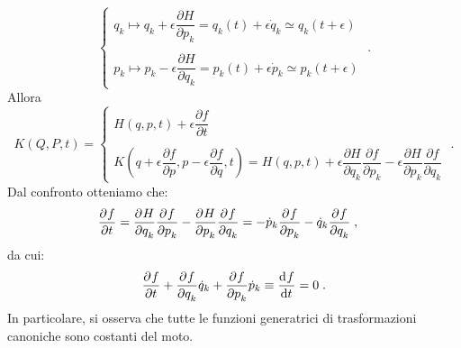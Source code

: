 \begin{equation}
\begin{cases}
q_k\longmapsto q_k+\epsilon\dfrac{\partial H}{\partial p_k}=q_k(t)+\epsilon\dot{q}_k\simeq q_k(t+\epsilon) \\
\\
p_k\longmapsto p_k-\epsilon\dfrac{\partial H}{\partial q_k}=p_k(t)+\epsilon\dot{p}_k\simeq p_k(t+\epsilon)
\end{cases}\;.
\end{equation}
Allora
\begin{equation}
K(Q,P,t) = \begin{cases}
H(q,p,t)+\epsilon\dfrac{\partial f}{\partial t} \\
\\
K\left(q+\epsilon\dfrac{\partial f}{\partial p},p-\epsilon\dfrac{\partial f}{\partial q},t\right)=H(q,p,t)+\epsilon\dfrac{\partial H}{\partial q_k}\dfrac{\partial f}{\partial p_k}-\epsilon\dfrac{\partial H}{\partial p_k}\dfrac{\partial f}{\partial q_k}
\end{cases}\;.
\end{equation}
Dal confronto otteniamo che:
\begin{align}
&\frac{\partial^{}f}{\partial t^{}}=\frac{\partial^{}H}{\partial q_k^{}}\frac{\partial^{}f}{\partial p_k^{}}-\frac{\partial^{}H}{\partial p_k^{}}\frac{\partial^{}f}{\partial q_k^{}}=-\dot{p}_k\frac{\partial^{}f}{\partial p_k^{}}-\dot{q}_k\frac{\partial^{}f}{\partial q_k^{}}\;,
\end{align}
da cui:
\begin{equation}
\frac{\partial^{}f}{\partial t^{}}+\frac{\partial^{}f}{\partial q_k^{}}\dot{q}_k+\frac{\partial^{}f}{\partial p_k^{}}\dot{p}_k\equiv \frac{\mathrm{d}^{}f}{\mathrm{d}t^{}}=0\;.
\end{equation}
In particolare, si osserva che tutte le funzioni generatrici di trasformazioni canoniche sono costanti del moto.
